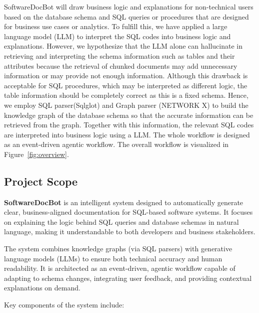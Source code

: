 \documentclass[11pt]{article}
\begin{document}
SoftwareDocBot will draw business logic and explanations for non-technical users based on the database schema and SQL queries or procedures that are designed for business use cases or analytics. To fulfill this, we have applied a large language model (LLM)  to interpret the SQL codes into business logic and explanations. However, we hypothesize that the LLM alone can hallucinate in retrieving and interpreting the schema information such as tables and their attributes because the retrieval of chunked documents may add unnecessary information or may provide not enough information. Although this drawback is acceptable for SQL procedures, which may be interpreted as different logic, the table information should be completely correct as this is a fixed schema. Hence, we employ SQL parser(Sqlglot) and Graph parser (NETWORK X) to build the knowledge graph of the database schema so that the accurate information can be retrieved from the graph. Together with this information, the relevant SQL codes are interpreted into business logic using a LLM. The whole workflow is designed as an event-driven agentic workflow. The overall workflow is visualized in Figure~\ref{fig:overview}.





\subsection{Project Scope}



\textbf{SoftwareDocBot} is an intelligent system designed to automatically generate clear, business-aligned documentation for SQL-based software systems. It focuses on explaining the logic behind SQL queries and database schemas in natural language, making it understandable to both developers and business stakeholders.

The system combines knowledge graphs (via SQL parsers) with generative language models (LLMs) to ensure both technical accuracy and human readability. It is architected as an event-driven, agentic workflow capable of adapting to schema changes, integrating user feedback, and providing contextual explanations on demand.

Key components of the system include:
\end{document}
